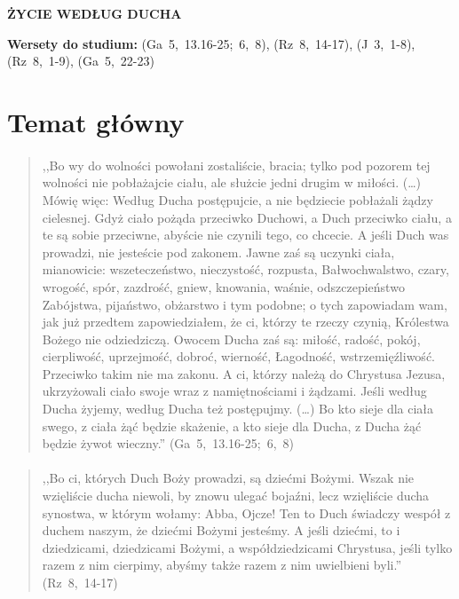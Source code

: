 \documentclass[10pt,a4paper,oneside]{article}
\begin{document}
\centerline{\textbf{\MakeUppercase{Życie według Ducha}}}
\begin{center}
\textbf{Wersety do studium:} \mbox{(Ga 5, 13.16-25; 6, 8)}, \mbox{(Rz 8, 14-17)}, \mbox{(J 3, 1-8)}, \mbox{(Rz 8, 1-9)}, \mbox{(Ga 5, 22-23)}
\end{center}
\section{Temat główny}
\paragraph{}
\begin{quote}
,,Bo wy do wolności powołani zostaliście, bracia; tylko pod pozorem tej wolności nie pobłażajcie ciału, ale służcie jedni drugim w miłości. (\ldots) Mówię więc: Według Ducha postępujcie, a nie będziecie pobłażali żądzy cielesnej. Gdyż ciało pożąda przeciwko Duchowi, a Duch przeciwko ciału, a te są sobie przeciwne, abyście nie czynili tego, co chcecie. A jeśli Duch was prowadzi, nie jesteście pod zakonem. Jawne zaś są uczynki ciała, mianowicie: wszeteczeństwo, nieczystość, rozpusta, Bałwochwalstwo, czary, wrogość, spór, zazdrość, gniew, knowania, waśnie, odszczepieństwo Zabójstwa, pijaństwo, obżarstwo i tym podobne; o tych zapowiadam wam, jak już przedtem zapowiedziałem, że ci, którzy te rzeczy czynią, Królestwa Bożego nie odziedziczą. Owocem Ducha zaś są: miłość, radość, pokój, cierpliwość, uprzejmość, dobroć, wierność, Łagodność, wstrzemięźliwość. Przeciwko takim nie ma zakonu. A ci, którzy należą do Chrystusa Jezusa, ukrzyżowali ciało swoje wraz z namiętnościami i żądzami. Jeśli według Ducha żyjemy, według Ducha też postępujmy. (\ldots) Bo kto sieje dla ciała swego, z ciała żąć będzie skażenie, a kto sieje dla Ducha, z Ducha żąć będzie żywot wieczny.'' \mbox{(Ga 5, 13.16-25; 6, 8)}
\end{quote}
\paragraph{}
\begin{quote}
,,Bo ci, których Duch Boży prowadzi, są dziećmi Bożymi. Wszak nie wzięliście ducha niewoli, by znowu ulegać bojaźni, lecz wzięliście ducha synostwa, w którym wołamy: Abba, Ojcze! Ten to Duch świadczy wespół z duchem naszym, że dziećmi Bożymi jesteśmy. A jeśli dziećmi, to i dziedzicami, dziedzicami Bożymi, a współdziedzicami Chrystusa, jeśli tylko razem z nim cierpimy, abyśmy także razem z nim uwielbieni byli.'' \mbox{(Rz 8, 14-17)}
\end{quote}
\end{document}

